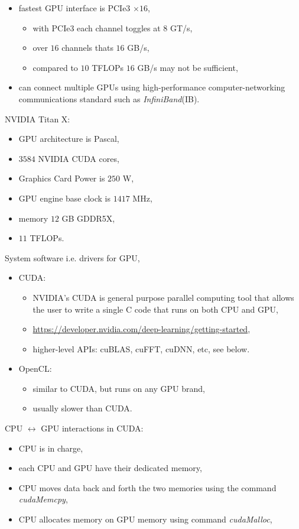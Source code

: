 \documentclass[onecolumn]{IEEEtran}
\newcommand{\bi}{\begin{itemize}}
\newcommand{\ei}{\end{itemize}}
\begin{document}
\begin{itemize}
        \item fastest GPU interface is PCIe3 $\times 16$,
        \bi
            \item with PCIe3 each channel toggles at $8$ GT/s,
            \item over $16$ channels thats $16$ GB/s,
            \item compared to $10$ TFLOPs  $16$ GB/s may not be sufficient,
        \ei
        \item can connect multiple GPUs using  high-performance computer-networking communications standard such as \emph{InfiniBand}(IB).
    \ei
    \item NVIDIA Titan X:
    \bi
        \item GPU architecture is Pascal,
        \item $3584$ NVIDIA CUDA cores,
        \item Graphics Card Power is $250$ W,
        \item GPU engine base clock is $1417$ MHz,
        \item memory $12$ GB GDDR5X,
        \item $11$ TFLOPs.
    \ei
    \item System software i.e. drivers for GPU,
    \bi
        \item CUDA:
        \bi
            \item NVIDIA's CUDA is general purpose parallel computing tool that allows the user to write a single C code that runs on both CPU and GPU,
            \item \url{https://developer.nvidia.com/deep-learning/getting-started},
            \item higher-level APIs: cuBLAS, cuFFT, cuDNN, etc, see below.
        \ei
        \item OpenCL:
        \bi
            \item similar to CUDA, but runs on any GPU brand,
            \item usually slower than CUDA.
        \ei
    \ei
    \item CPU $\leftrightarrow$ GPU interactions in CUDA:
    \bi
        \item CPU is in charge,
        \item each CPU and GPU have their dedicated memory,
        \item CPU moves data back and forth the two memories using the command \emph{cudaMemcpy},
        \item CPU allocates memory on GPU memory using command \emph{cudaMalloc},

\end{itemize}
\end{document}
